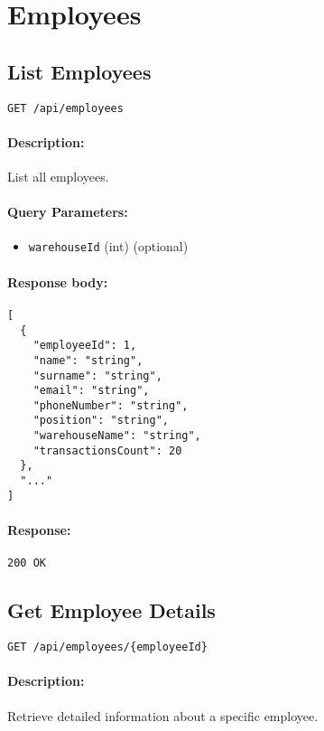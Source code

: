 \documentclass[a4paper,11pt]{article}
\begin{document}
\section{Employees}
\label{sec:employees}

\subsection{List Employees}
\label{sec:employees-all}
\begin{verbatim}
GET /api/employees
\end{verbatim}
\paragraph{Description:} List all employees.
\paragraph{Query Parameters:}
\begin{itemize}
  \item \texttt{warehouseId} (int) (optional)
\end{itemize}
\paragraph{Response body:}
\begin{verbatim}
[
  {
    "employeeId": 1,
    "name": "string",
    "surname": "string",
    "email": "string",
    "phoneNumber": "string",
    "position": "string",
    "warehouseName": "string",
    "transactionsCount": 20
  },
  "..."
]
\end{verbatim}
\paragraph{Response:} \texttt{200 OK}

\subsection{Get Employee Details}
\label{sec:employees-details}
\begin{verbatim}
GET /api/employees/{employeeId}
\end{verbatim}
\paragraph{Description:} Retrieve detailed information about a specific employee.
\end{document}
